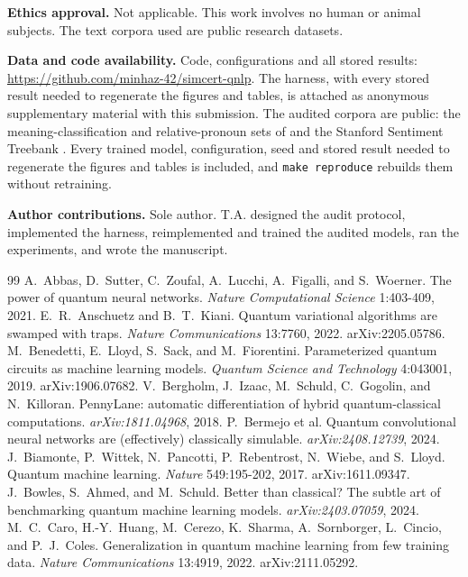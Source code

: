 \documentclass[10pt]{article}
\makeatletter
\newcommand{\repoavailability}{%
  \if@preprint
    Code, configurations and all stored results:
    \url{https://github.com/minhaz-42/simcert-qnlp}.%
  \else
    The harness, with every stored result needed to regenerate the figures and tables, is
    attached as anonymous supplementary material with this submission.%
  \fi}
\makeatother
\begin{document}
\textbf{Ethics approval.} Not applicable. This work involves no human or animal subjects. The
text corpora used are public research datasets.

\textbf{Data and code availability.} \repoavailability{} The audited corpora are public: the
meaning-classification and relative-pronoun sets of \citet{lorenz2021} and the Stanford Sentiment
Treebank \citep{socher2013}. Every trained model, configuration, seed and stored result needed to
regenerate the figures and tables is included, and \texttt{make reproduce} rebuilds them without
retraining.

\textbf{Author contributions.} Sole author. T.A. designed the audit protocol, implemented the
harness, reimplemented and trained the audited models, ran the experiments, and wrote the
manuscript.

\begin{thebibliography}{99}
\small
{} A.~Abbas, D.~Sutter, C.~Zoufal, A.~Lucchi, A.~Figalli, and
S.~Woerner. The power of quantum neural networks. \emph{Nature Computational Science} 1:403-409,
2021.
 E.~R.~Anschuetz and B.~T.~Kiani. Quantum
variational algorithms are swamped with traps. \emph{Nature Communications} 13:7760, 2022.
arXiv:2205.05786.
 M.~Benedetti, E.~Lloyd, S.~Sack, and M.~Fiorentini.
Parameterized quantum circuits as machine learning models. \emph{Quantum Science and Technology}
4:043001, 2019. arXiv:1906.07682.
 V.~Bergholm, J.~Izaac, M.~Schuld, C.~Gogolin, and
N.~Killoran. PennyLane: automatic differentiation of hybrid quantum-classical computations.
\emph{arXiv:1811.04968}, 2018.
 P.~Bermejo et al. Quantum convolutional neural networks
are (effectively) classically simulable. \emph{arXiv:2408.12739}, 2024.
 J.~Biamonte, P.~Wittek, N.~Pancotti, P.~Rebentrost,
N.~Wiebe, and S.~Lloyd. Quantum machine learning. \emph{Nature} 549:195-202, 2017.
arXiv:1611.09347.
 J.~Bowles, S.~Ahmed, and M.~Schuld. Better than classical?
The subtle art of benchmarking quantum machine learning models. \emph{arXiv:2403.07059}, 2024.
 M.~C.~Caro, H.-Y.~Huang, M.~Cerezo, K.~Sharma, A.~Sornborger,
L.~Cincio, and P.~J.~Coles. Generalization in quantum machine learning from few training data.
\emph{Nature Communications} 13:4919, 2022. arXiv:2111.05292.

\end{thebibliography}
\end{document}
